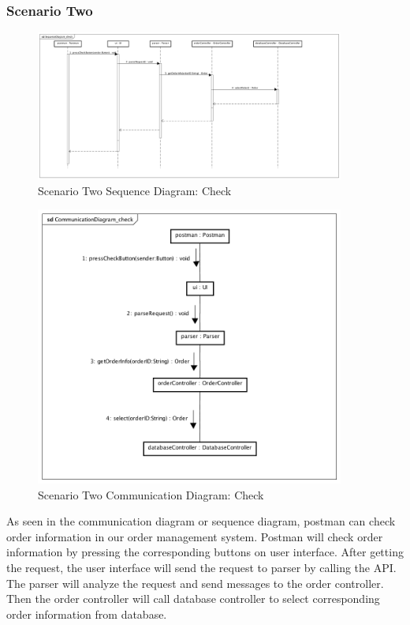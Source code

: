 \documentclass[12pt]{scrreprt}
\begin{document}
\subsubsection{Scenario Two}
\begin{figure}[H]
  \centering\includegraphics[width=4in]{DocumentRes/2SequenceDiagram_check.png}
  \caption{Scenario Two Sequence Diagram: Check}
\end{figure}
\begin{figure}[H]
  \centering\includegraphics[width=4in]{DocumentRes/2CommunicationDiagram_check.png}
  \caption{Scenario Two Communication Diagram: Check}
\end{figure}
As seen in the communication diagram or sequence diagram, postman can check
order information in our order management system. Postman will check order
information by pressing the corresponding buttons on user interface. After
getting the request, the user interface will send the request to parser by
calling the API. The parser will analyze the request and send messages to the
order controller. Then the order controller will call database controller to
select corresponding order information from database.
\end{document}

